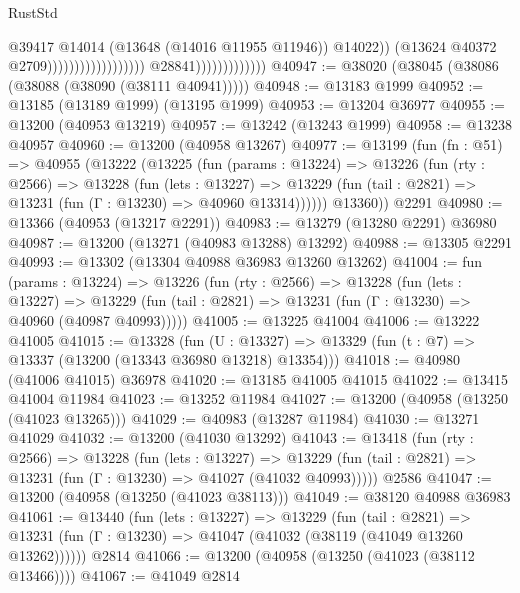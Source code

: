 \begin{lexlean}{RustStd}
\begin{coremodule}
                                                                    @39417
                                                                    @14014
                                                                    (@13648 (@14016 @11955 @11946))
                                                                    @14022))
                                                                (@13624
                                                                  @40372
                                                                  @2709))))))))))))))))))
                              @28841)))))))))))))
@40947 := @38020 (@38045 (@38086 (@38088 (@38090 (@38111 @40941)))))
@40948 := @13183 @1999
@40952 := @13185 (@13189 @1999) (@13195 @1999)
@40953 := @13204 @36977
@40955 := @13200 (@40953 @13219)
@40957 := @13242 (@13243 @1999)
@40958 := @13238 @40957
@40960 := @13200 (@40958 @13267)
@40977 := @13199
    (fun (fn : @51) =>
    @40955
      (@13222
        (@13225
          (fun (params : @13224) =>
          @13226
            (fun (rty : @2566) =>
            @13228
              (fun (lets : @13227) =>
              @13229 (fun (tail : @2821) => @13231 (fun (Γ : @13230) => @40960 @13314))))))
        @13360))
    @2291
@40980 := @13366 (@40953 (@13217 @2291))
@40983 := @13279 (@13280 @2291) @36980
@40987 := @13200 (@13271 (@40983 @13288) @13292)
@40988 := @13305 @2291
@40993 := @13302 (@13304 @40988 @36983 @13260 @13262)
@41004 := fun (params : @13224) =>
  @13226
    (fun (rty : @2566) =>
    @13228
      (fun (lets : @13227) =>
      @13229 (fun (tail : @2821) => @13231 (fun (Γ : @13230) => @40960 (@40987 @40993)))))
@41005 := @13225 @41004
@41006 := @13222 @41005
@41015 := @13328
    (fun (U : @13327) => @13329 (fun (t : @7) => @13337 (@13200 (@13343 @36980 @13218) @13354)))
@41018 := @40980 (@41006 @41015) @36978
@41020 := @13185 @41005 @41015
@41022 := @13415 @41004 @11984
@41023 := @13252 @11984
@41027 := @13200 (@40958 (@13250 (@41023 @13265)))
@41029 := @40983 (@13287 @11984)
@41030 := @13271 @41029
@41032 := @13200 (@41030 @13292)
@41043 := @13418
    (fun (rty : @2566) =>
    @13228
      (fun (lets : @13227) =>
      @13229 (fun (tail : @2821) => @13231 (fun (Γ : @13230) => @41027 (@41032 @40993)))))
    @2586
@41047 := @13200 (@40958 (@13250 (@41023 @38113)))
@41049 := @38120 @40988 @36983
@41061 := @13440
    (fun (lets : @13227) =>
    @13229
      (fun (tail : @2821) =>
      @13231 (fun (Γ : @13230) => @41047 (@41032 (@38119 (@41049 @13260 @13262))))))
    @2814
@41066 := @13200 (@40958 (@13250 (@41023 (@38112 @13466))))
@41067 := @41049 @2814

\end{coremodule}
\end{lexlean}
